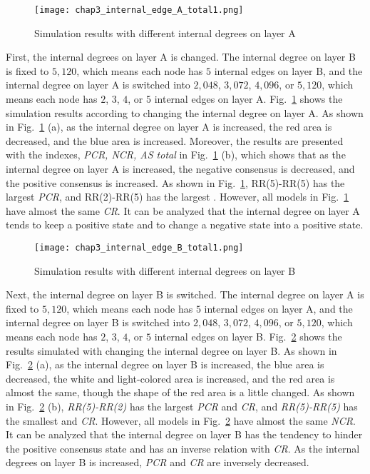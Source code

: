 \begin{figure}[!htb]
	\centering
	\texttt{[image: chap3\_internal\_edge\_A\_total1.png]}
	\caption{Simulation results with different internal degrees on layer A}
	\label{chap3_internal_edge_A_total}
\end{figure}

First, the internal degrees on layer A is changed. The internal degree on layer B is fixed to $5,120$, which means each node has $5$ internal edges on layer B, and the internal degree on layer A is switched into $2,048$, $3,072$, $4,096$, or $5,120$, which means each node has $2$, $3$, $4$, or $5$ internal edges on layer A. Fig.~\ref{chap3_internal_edge_A_total} shows the simulation results according to changing the internal degree on layer A. As shown in Fig.~\ref{chap3_internal_edge_A_total} (a), as the internal degree on layer A is increased, the red area is decreased, and the blue area is increased. Moreover, the results are presented with the indexes, \textit{PCR, NCR, AS total} in Fig.~\ref{chap3_internal_edge_A_total} (b), which shows that as the internal degree on layer A is increased, the negative consensus is decreased, and the positive consensus is increased. As shown in Fig.~\ref{chap3_internal_edge_A_total}, RR(5)-RR(5) has the largest \textit{PCR}, and RR(2)-RR(5) has the largest . However, all models in Fig.~\ref{chap3_internal_edge_A_total} have almost the same \textit{CR}. It can be analyzed that the internal degree on layer A tends to keep a positive state and to change a negative state into a positive state. 

\begin{figure}[!htb]
	\centering
	\texttt{[image: chap3\_internal\_edge\_B\_total1.png]}
	\caption{Simulation results with different internal degrees on layer B}
	\label{chap3_internal_edge_B_total}
\end{figure}

Next, the internal degree on layer B is switched. The internal degree on layer A is fixed to  $5,120$, which means each node has $5$ internal edges on layer A, and the internal degree on layer B is switched into $2,048$, $3,072$, $4,096$, or $5,120$, which means each node has $2$, $3$, $4$, or $5$ internal edges on layer B. Fig.~\ref{chap3_internal_edge_B_total} shows the results simulated with changing the internal degree on layer B. As shown in Fig.~\ref{chap3_internal_edge_B_total} (a), as the internal degree on layer B is increased, the blue area is decreased, the white and light-colored area is increased, and the red area is almost the same, though the shape of the red area is a little changed.  As shown in Fig.~\ref{chap3_internal_edge_B_total} (b), \textit{RR(5)-RR(2)} has the largest \textit{PCR} and \textit{CR}, and \textit{RR(5)-RR(5)} has the smallest  and \textit{CR}. However, all models in Fig.~\ref{chap3_internal_edge_B_total} have almost the same \textit{NCR}. It can be analyzed that the internal degree on layer B has the tendency to hinder the positive consensus state and has an inverse relation with \textit{CR}. As the internal degrees on layer B is increased, \textit{PCR} and \textit{CR} are inversely decreased.

